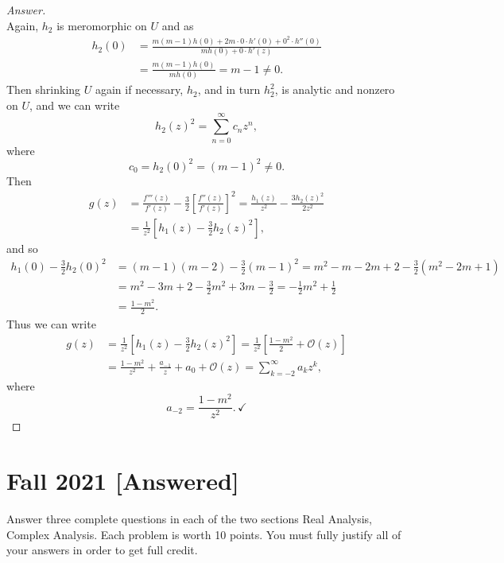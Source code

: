 \documentclass[12pt]{article}
\newcommand\paren[1]{\left( #1 \right)}
\newcommand{\sqbrack}[1]{\left [ #1 \right ]}
\theoremstyle{definition}
\begin{document}
\begin{proof}[Answer]
\[    \]
    Again, $h_2$ is meromorphic on $U$ and as 
    \begin{align*}
        h_2(0) & = \frac{ m(m-1) h(0) + 2m \cdot 0 \cdot h'(0) + 0^2 \cdot h''(0) }{ m h(0) + 0 \cdot h'(z) } \\ 
        & = \frac{m(m-1)h(0)}{mh(0)} = m-1 \neq 0 . 
    \end{align*}
    Then shrinking $U$ again if necessary, $h_2$, and in turn $h_2^2$, is analytic and nonzero on $U$, and we can write 
    \[
        h_2(z)^2 = \sum\limits_{n = 0}^{\infty} c_n z^n , 
    \]
    where 
    \[
        c_0 = h_2(0)^2 = (m-1)^2 \neq 0 . 
    \]
    Then 
    \begin{align*}
        g(z) & = \frac{f'''(z)}{f'(z)} - \frac{3}{2} \sqbrack{ \frac{f''(z)}{f'(z)} }^2 = \frac{h_1(z)}{z^2} - \frac{3 h_2(z)^2 }{2z^2} \\ 
        & = \frac{1}{z^2} \sqbrack{ h_1(z) - \frac{3}{2} h_2(z)^2 } ,
    \end{align*}
    and so 
    \begin{align*}
        h_1(0) - \frac{3}{2} h_2(0)^2 & = (m-1)(m-2) - \frac{3}{2} (m-1)^2 = m^2 - m -2m + 2 - \frac{3}{2} \paren{ m^2 - 2m + 1 } \\ 
        & = m^2 - 3m + 2 - \frac{3}{2} m^2 + 3m - \frac{3}{2} = -\frac{1}{2}m^2 + \frac{1}{2} \\ 
        & = \frac{1 - m^2}{2} .
    \end{align*}
    Thus we can write 
    \begin{align*}
        g(z) & = \frac{1}{z^2} \sqbrack{ h_1(z) - \frac{3}{2} h_2(z)^2 } = \frac{1}{z^2} \sqbrack{ \frac{1 - m^2}{2} + \mathcal{O}(z) } \\ 
        & = \frac{1 - m^2}{z^2} + \frac{a_{-1}}{z} + a_0 + \mathcal{O}(z) = \sum\limits_{k = -2}^{\infty} a_{k} z^k , 
    \end{align*}
    where 
    \[
        a_{-2} = \frac{1 - m^2}{z^2} . \, \checkmark
    \]
\end{proof}

\newpage

\newpage
\section{Fall 2021 [Answered]}
Answer three complete questions in each of the two sections Real Analysis, Complex Analysis. Each problem is worth 10 points. You must fully justify all of your answers in order to get full credit. 
\end{document}
